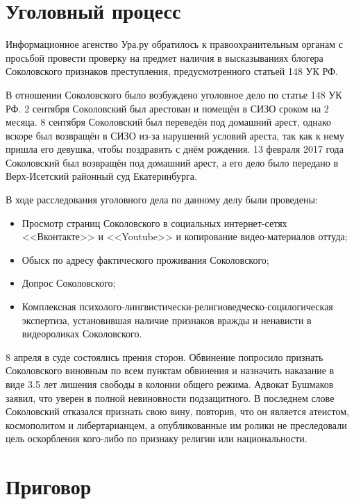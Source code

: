 \documentclass[a4paper]{article}
\begin{document}
	\section{Уголовный процесс}
		Информационное агенство Ура.ру обратилось к правоохранительным органам с просьбой провести проверку на предмет наличия в высказываниях блогера Соколовского признаков преступления, предусмотренного статьей 148 УК РФ. 
		
		В отношении Соколовского было возбуждено уголовное дело по статье 148 УК РФ. 2 сентября Соколовский был арестован и помещён в СИЗО сроком на 2 месяца. 8 сентября Соколовский был переведён под домашний арест, однако вскоре был возвращён в СИЗО из-за нарушений условий ареста, так как к нему пришла его девушка, чтобы поздравить с днём рождения. 13 февраля 2017 года Соколовский был возвращён под домашний арест, а его дело было передано в Верх-Исетский районный суд Екатеринбурга.
		
		В ходе расследования уголовного дела по данному делу были проведены:
		\begin{itemize}
			\item Просмотр страниц Соколовского в социальных интернет-сетях <<Вконтакте>> и <<Youtube>> и копирование видео-материалов оттуда;

			\item Обыск по адресу фактического проживания Соколовского;

			\item Допрос Соколовского;

			\item Комплексная психолого-лингвистически-религиоведческо-социлогическая экспертиза, установившая наличие признаков вражды и ненависти в видеороликах Соколовского.
		\end{itemize}
		
		8 апреля в суде состоялись прения сторон. Обвинение попросило признать Соколовского виновным по всем пунктам обвинения и назначить наказание в виде 3.5 лет лишения свободы в колонии общего режима. Адвокат Бушмаков заявил, что уверен в полной невиновности подзащитного. В последнем слове Соколовский отказался признать свою вину, повторив, что он является атеистом, космополитом и либертарианцем, а опубликованные им ролики не преследовали цель оскорбления кого-либо по признаку религии или национальности.
			
	\section{Приговор}
	
\end{document}
